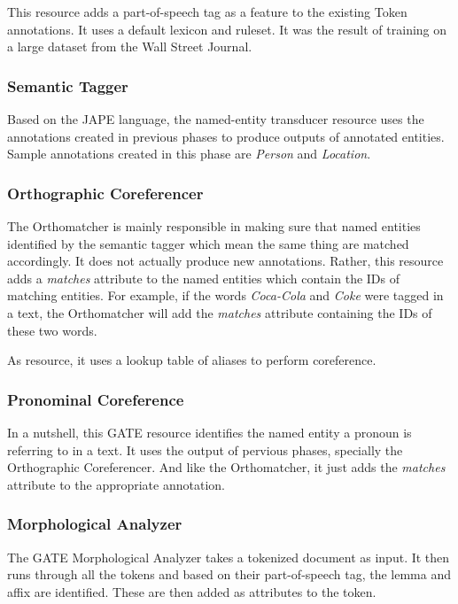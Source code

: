 This resource adds a part-of-speech tag as a feature to the existing Token annotations. It uses a default lexicon and ruleset. It was the result of training on a large dataset from the Wall Street Journal.

\subsubsection{Semantic Tagger}
\label{sec:semantictagger}

Based on the JAPE language, the named-entity transducer resource uses the annotations created in previous phases to produce outputs of annotated entities. Sample annotations created in this phase are \textit{Person} and \textit{Location}.

\subsubsection{Orthographic Coreferencer}
\label{sec:ortho}

The Orthomatcher is mainly responsible in making sure that named entities identified by the semantic tagger which mean the same thing are matched accordingly. It does not actually produce new annotations. Rather, this resource adds a \textit{matches} attribute to the named entities which contain the IDs of matching entities. For example, if the words \textit{Coca-Cola} and \textit{Coke} were tagged in a text, the Orthomatcher will add the \textit{matches} attribute containing the IDs of these two words. 

As resource, it uses a lookup table of aliases to perform coreference. 

\subsubsection{Pronominal Coreference}
\label{sec:pronominal}

In a nutshell, this GATE resource identifies the named entity a pronoun is referring to in a text. It uses the output of pervious phases, specially the Orthographic Coreferencer. And like the Orthomatcher, it just adds the \textit{matches} attribute to the appropriate annotation.

\subsubsection{Morphological Analyzer}
\label{sec:morphological}

The GATE Morphological Analyzer takes a tokenized document as input. It then runs through all the tokens and based on their part-of-speech tag, the lemma and affix are identified. These are then added as attributes to the token. 

